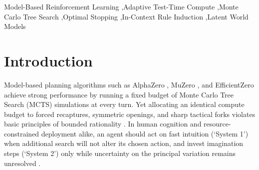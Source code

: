 \documentclass[preprint,3p,times]{elsarticle}
\begin{document}
\begin{frontmatter}
\begin{keyword}
Model-Based Reinforcement Learning \sep Adaptive Test-Time Compute \sep Monte Carlo Tree Search \sep Optimal Stopping \sep In-Context Rule Induction \sep Latent World Models
\end{keyword}

\end{frontmatter}

\section{Introduction}
Model-based planning algorithms such as AlphaZero \citep{silver2018general}, MuZero \citep{schrittwieser2020mastering}, and EfficientZero \citep{ye2021mastering} achieve strong performance by running a fixed budget of Monte Carlo Tree Search (MCTS) simulations at every turn. Yet allocating an identical compute budget to forced recaptures, symmetric openings, and sharp tactical forks violates basic principles of bounded rationality \citep{russell1991right,hay2012selecting}. In human cognition and resource-constrained deployment alike, an agent should act on fast intuition (`System 1') when additional search will not alter its chosen action, and invest imagination steps (`System 2') only while uncertainty on the principal variation remains unresolved \citep{anthony2017thinking,hamrick2017metacontrol}.
\end{document}
